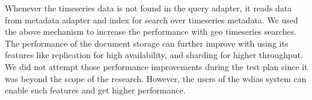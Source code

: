 Whenever the timeseries data is not found in the query adapter, it reads data from metadata adapter and index for search over timeseries metadata. We used the above mechanism to increase the performance with geo timeseries searches. The performance of the document storage can further improve with using its features like replication for high availability, and sharding for higher throughput.
We did not attempt those performance improvements during the test plan since it was beyond the scope of the research. However, the users of the \acrshort{wdias} system can enable such features and get higher performance.
